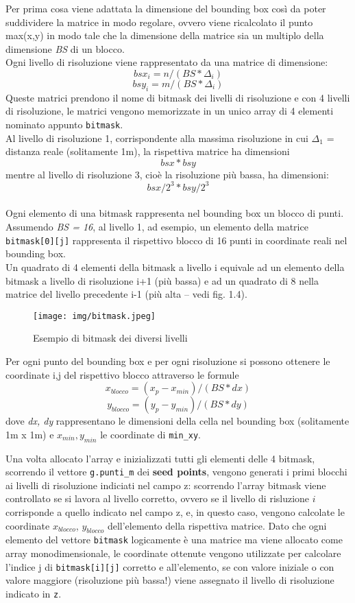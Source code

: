 			Per prima cosa viene adattata la dimensione del bounding box cos\`{i} da poter suddividere la matrice in modo regolare, ovvero viene ricalcolato il punto max(x,y) in modo tale che la dimensione della matrice sia un multiplo della dimensione \textit{BS} di un blocco.\\
			Ogni livello di risoluzione viene rappresentato da una matrice di dimensione:\\
			\[
				bsx_i = n / (BS * \Delta_i)
			\]
			\[
				bsy_i = m / (BS * \Delta_i) 
			\]
			Queste matrici prendono il nome di bitmask dei livelli di risoluzione e con 4 livelli di risoluzione, le matrici vengono memorizzate in un unico array di 4 elementi nominato appunto \texttt{bitmask}.\\
			Al livello di risoluzione 1, corrispondente alla massima risoluzione in cui $\Delta_1$ = distanza reale (solitamente 1m), la rispettiva matrice ha dimensioni \[bsx * bsy\] mentre al livello di risoluzione 3, cio\`{e} la risoluzione pi\`{u} bassa, ha dimensioni: \[bsx/2^3 * bsy/2^3\] \\
			Ogni elemento di una bitmask rappresenta nel bounding box un blocco di punti. Assumendo \textit{BS = 16}, al livello 1, ad esempio, un elemento della matrice \texttt{bitmask[0][j]} rappresenta il rispettivo blocco di 16 punti in coordinate reali nel bounding box.\\
			Un quadrato di 4 elementi della bitmask a livello i equivale ad un elemento della bitmask a livello di risoluzione i+1 (pi\`{u} bassa) e ad un quadrato di 8 nella matrice del livello precedente i-1 (pi\`{u} alta -- vedi fig. 1.4).\\
			\begin{figure}[htbp]
				\centering
				\texttt{[image: img/bitmask.jpeg]}
				\caption{Esempio di bitmask dei diversi livelli}
			\end{figure}
			Per ogni punto del bounding box e per ogni risoluzione si possono ottenere le coordinate i,j del rispettivo blocco attraverso le formule
			\[
				x_{blocco} = (x_p - x_{min}) / (BS * dx) 
			\]
			\[
				y_{blocco} = (y_p - y_{min}) / (BS * dy) 
			\]
			dove \textit{dx, dy} rappresentano le dimensioni della cella nel bounding box (solitamente 1m x 1m) e $x_{min}, y_{min}$ le coordinate di \texttt{min\_xy}.

			Una volta allocato l'array e inizializzati tutti gli elementi delle 4 bitmask, scorrendo il vettore \texttt{g.punti\_m} dei \textbf{seed points}, vengono generati i primi blocchi ai livelli di risoluzione indiciati nel campo z: scorrendo l'array bitmask viene controllato se si lavora al livello corretto, ovvero se il livello di risluzione $i$ corrisponde a quello indicato nel campo z, e, in questo caso, vengono calcolate le coordinate $x_{blocco}$, $y_{blocco}$ dell'elemento della rispettiva matrice. Dato che ogni elemento del vettore \texttt{bitmask} logicamente \`{e} una matrice ma viene allocato come array monodimensionale, le coordinate ottenute vengono utilizzate per calcolare l'indice j di \texttt{bitmask[i][j]} corretto e all'elemento, se con valore iniziale o con valore maggiore (risoluzione pi\`{u} bassa!) viene assegnato il livello di risoluzione indicato in \texttt{z}.

